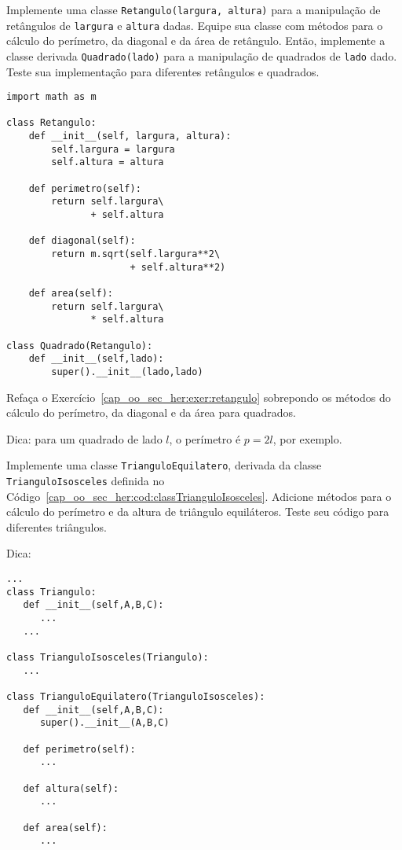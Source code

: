 \begin{exer}\label{cap_oo_sec_her:exer:retangulo}
  Implemente uma classe \lstinline+Retangulo(largura, altura)+ para a manipulação de retângulos de \lstinline+largura+ e \lstinline+altura+ dadas. Equipe sua classe com métodos para o cálculo do perímetro, da diagonal e da área de retângulo. Então, implemente a classe derivada \lstinline+Quadrado(lado)+ para a manipulação de quadrados de \lstinline+lado+ dado. Teste sua implementação para diferentes retângulos e quadrados.
\end{exer}
\begin{resp}

\begin{lstlisting}
import math as m

class Retangulo:
    def __init__(self, largura, altura):
        self.largura = largura
        self.altura = altura

    def perimetro(self):
        return self.largura\
               + self.altura

    def diagonal(self):
        return m.sqrt(self.largura**2\
                      + self.altura**2)

    def area(self):
        return self.largura\
               * self.altura

class Quadrado(Retangulo):
    def __init__(self,lado):
        super().__init__(lado,lado)
\end{lstlisting}

\end{resp}

\begin{exer}
  Refaça o Exercício~\ref{cap_oo_sec_her:exer:retangulo} sobrepondo os métodos do cálculo do perímetro, da diagonal e da área para quadrados.
\end{exer}
\begin{resp}
  Dica: para um quadrado de lado $l$, o perímetro é $p = 2l$, por exemplo.
\end{resp}

\begin{exer}
  Implemente uma classe \lstinline+TrianguloEquilatero+, derivada da classe \lstinline+TrianguloIsosceles+ definida no Código~\ref{cap_oo_sec_her:cod:classTrianguloIsosceles}. Adicione métodos para o cálculo do perímetro e da altura de triângulo equiláteros. Teste seu código para diferentes triângulos.
\end{exer}
\begin{resp}
  Dica:

\begin{lstlisting}
...
class Triangulo:
   def __init__(self,A,B,C):
      ...
   ...

class TrianguloIsosceles(Triangulo):
   ...

class TrianguloEquilatero(TrianguloIsosceles):
   def __init__(self,A,B,C):
      super().__init__(A,B,C)

   def perimetro(self):
      ...

   def altura(self):
      ...
   
   def area(self):
      ...
\end{lstlisting}

\end{resp}

